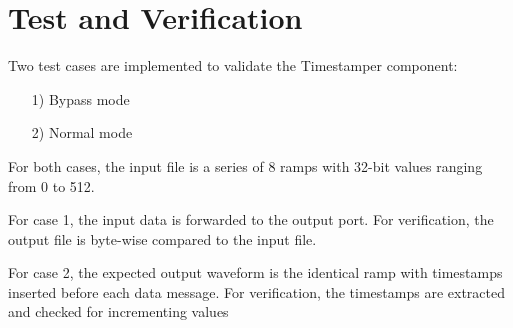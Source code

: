 \documentclass{article}
\def\Comp{Timestamper}
\begin{document}
\section*{Test and Verification}
\begin{flushleft}
	Two test cases are implemented to validate the \Comp{} component:
	\begin{itemize}
		\item[1)] Bypass mode
		\item[2)] Normal mode
	\end{itemize}
	For both cases, the input file is a series of 8 ramps with 32-bit values ranging from 0 to 512.\par\medskip
	For case 1, the input data is forwarded to the output port. For verification, the output file is byte-wise compared to the input file.\par\medskip
	For case 2,  the expected output waveform is the identical ramp with timestamps inserted before each data message. For verification, the timestamps are extracted and checked for incrementing values
\end{flushleft}
\end{document}
